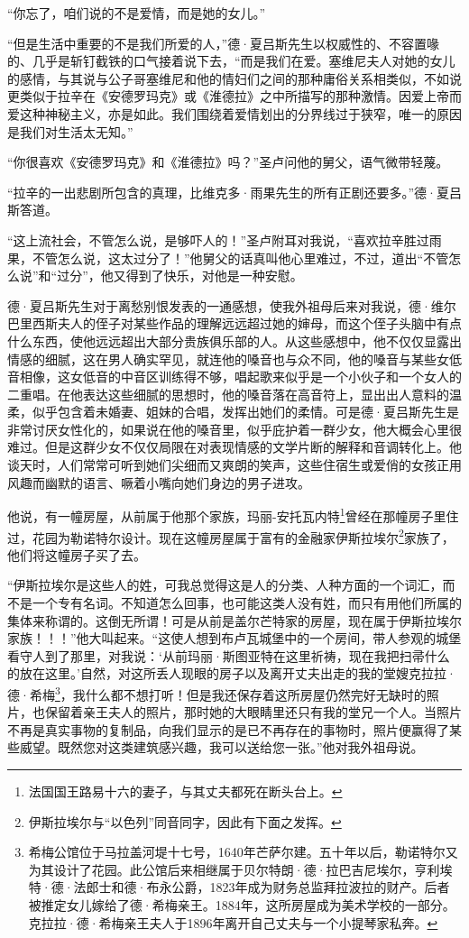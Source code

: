 \par “你忘了，咱们说的不是爱情，而是她的女儿。”
\par “但是生活中重要的不是我们所爱的人，”德·夏吕斯先生以权威性的、不容置喙的、几乎是斩钉截铁的口气接着说下去，“而是我们在爱。塞维尼夫人对她的女儿的感情，与其说与公子哥塞维尼和他的情妇们之间的那种庸俗关系相类似，不如说更类似于拉辛在《安德罗玛克》或《淮德拉》之中所描写的那种激情。因爱上帝而爱这种神秘主义，亦是如此。我们围绕着爱情划出的分界线过于狭窄，唯一的原因是我们对生活太无知。”
\par “你很喜欢《安德罗玛克》和《淮德拉》吗？”圣卢问他的舅父，语气微带轻蔑。
\par “拉辛的一出悲剧所包含的真理，比维克多·雨果先生的所有正剧还要多。”德·夏吕斯答道。
\par “这上流社会，不管怎么说，是够吓人的！”圣卢附耳对我说，“喜欢拉辛胜过雨果，不管怎么说，这太过分了！”他舅父的话真叫他心里难过，不过，道出“不管怎么说”和“过分”，他又得到了快乐，对他是一种安慰。
\par 德·夏吕斯先生对于离愁别恨发表的一通感想，使我外祖母后来对我说，德·维尔巴里西斯夫人的侄子对某些作品的理解远远超过她的婶母，而这个侄子头脑中有点什么东西，使他远远超出大部分贵族俱乐部的人。从这些感想中，他不仅仅显露出情感的细腻，这在男人确实罕见，就连他的嗓音也与众不同，他的嗓音与某些女低音相像，这女低音的中音区训练得不够，唱起歌来似乎是一个小伙子和一个女人的二重唱。在他表达这些细腻的思想时，他的嗓音落在高音符上，显出出人意料的温柔，似乎包含着未婚妻、姐妹的合唱，发挥出她们的柔情。可是德·夏吕斯先生是非常讨厌女性化的，如果说在他的嗓音里，似乎庇护着一群少女，他大概会心里很难过。但是这群少女不仅仅局限在对表现情感的文学片断的解释和音调转化上。他谈天时，人们常常可听到她们尖细而又爽朗的笑声，这些住宿生或爱俏的女孩正用风趣而幽默的语言、噘着小嘴向她们身边的男子进攻。
\par 他说，有一幢房屋，从前属于他那个家族，玛丽-安托瓦内特\footnote{法国国王路易十六的妻子，与其丈夫都死在断头台上。}曾经在那幢房子里住过，花园为勒诺特尔设计。现在这幢房屋属于富有的金融家伊斯拉埃尔\footnote{伊斯拉埃尔与“以色列”同音同字，因此有下面之发挥。}家族了，他们将这幢房子买了去。
\par “伊斯拉埃尔是这些人的姓，可我总觉得这是人的分类、人种方面的一个词汇，而不是一个专有名词。不知道怎么回事，也可能这类人没有姓，而只有用他们所属的集体来称谓的。这倒无所谓！可是从前是盖尔芒特家的房屋，现在属于伊斯拉埃尔家族！！！”他大叫起来。“这使人想到布卢瓦城堡中的一个房间，带人参观的城堡看守人到了那里，对我说：‘从前玛丽·斯图亚特在这里祈祷，现在我把扫帚什么的放在这里。’自然，对这所丢人现眼的房子以及离开丈夫出走的我的堂嫂克拉拉·德·希梅\footnote{希梅公馆位于马拉盖河堤十七号，1640年芒萨尔建。五十年以后，勒诺特尔又为其设计了花园。此公馆后来相继属于贝尔特朗·德·拉巴吉尼埃尔，亨利埃特·德·法郎士和德·布永公爵，1823年成为财务总监拜拉波拉的财产。后者被推定女儿嫁给了德·希梅亲王。1884年，这所房屋成为美术学校的一部分。克拉拉·德·希梅亲王夫人于1896年离开自己丈夫与一个小提琴家私奔。}，我什么都不想打听！但是我还保存着这所房屋仍然完好无缺时的照片，也保留着亲王夫人的照片，那时她的大眼睛里还只有我的堂兄一个人。当照片不再是真实事物的复制品，向我们显示的是已不再存在的事物时，照片便赢得了某些威望。既然您对这类建筑感兴趣，我可以送给您一张。”他对我外祖母说。
